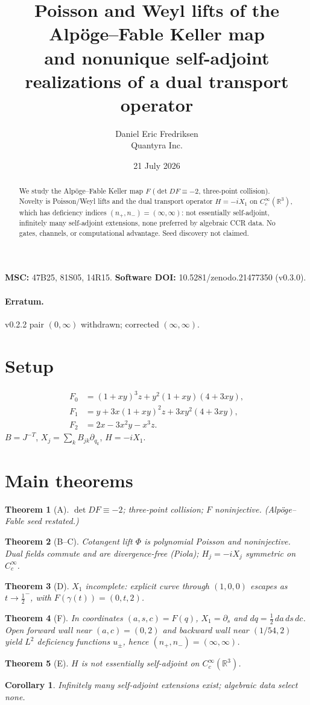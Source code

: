 ﻿\documentclass[11pt]{article}
\title{Poisson and Weyl lifts of the Alp\"oge--Fable Keller map\\ and nonunique self-adjoint realizations of a dual transport operator}
\author{Daniel Eric Fredriksen\\ Quantyra Inc.}
\date{21 July 2026}
\newtheorem{theorem}{Theorem}
\newtheorem{corollary}{Corollary}
\begin{document}
\maketitle
\begin{abstract}
We study the Alp\"oge--Fable Keller map $F$ ($\det DF\equiv-2$, three-point collision). Novelty is Poisson/Weyl lifts and the dual transport operator $H=-iX_1$ on $C_c^\infty(\mathbb{R}^3)$, which has deficiency indices $(n_+,n_-)=(\infty,\infty)$: not essentially self-adjoint, infinitely many self-adjoint extensions, none preferred by algebraic CCR data. No gates, channels, or computational advantage. Seed discovery not claimed.
\end{abstract}
\noindent\textbf{MSC:} 47B25, 81S05, 14R15.\quad
\textbf{Software DOI:} 10.5281/zenodo.21477350 (v0.3.0).

\paragraph{Erratum.} v0.2.2 pair $(0,\infty)$ withdrawn; corrected $(\infty,\infty)$.

\section{Setup}
\begin{align*}
F_0&=(1+xy)^3 z + y^2(1+xy)(4+3xy),\\
F_1&=y + 3x(1+xy)^2 z + 3xy^2(4+3xy),\\
F_2&=2x - 3x^2 y - x^3 z.
\end{align*}
$B=J^{-T}$, $X_j=\sum_k B_{jk}\partial_{q_k}$, $H=-iX_1$.

\section{Main theorems}
\begin{theorem}[A]
$\det DF\equiv-2$; three-point collision; $F$ noninjective. (Alp\"oge--Fable seed restated.)
\end{theorem}
\begin{theorem}[B--C]
Cotangent lift $\Phi$ is polynomial Poisson and noninjective. Dual fields commute and are divergence-free (Piola); $H_j=-iX_j$ symmetric on $C_c^\infty$.
\end{theorem}
\begin{theorem}[D]
$X_1$ incomplete: explicit curve through $(1,0,0)$ escapes as $t\to\tfrac12^-$, with $F(\gamma(t))=(0,t,2)$.
\end{theorem}
\begin{theorem}[F]
In coordinates $(a,s,c)=F(q)$, $X_1=\partial_s$ and $dq=\tfrac12\,da\,ds\,dc$. Open forward wall near $(a,c)=(0,2)$ and backward wall near $(1/54,2)$ yield $L^2$ deficiency functions $u_\pm$, hence $(n_+,n_-)=(\infty,\infty)$.
\end{theorem}
\begin{theorem}[E]
$H$ is not essentially self-adjoint on $C_c^\infty(\mathbb{R}^3)$.
\end{theorem}
\begin{corollary}
Infinitely many self-adjoint extensions exist; algebraic data select none.
\end{corollary}
\end{document}
